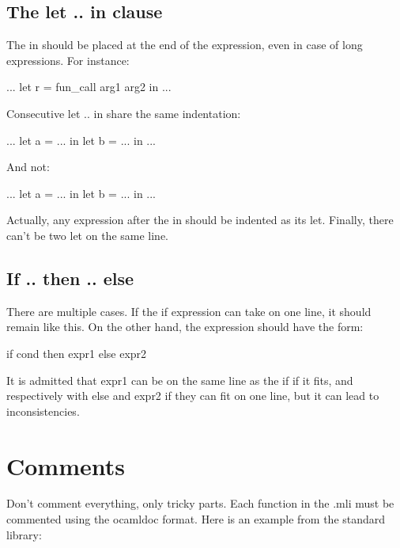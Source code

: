 \documentclass[12pt,a4paper]{article}
\begin{document}
\subsection*{The \textsf{let .. in} clause}

The \textsf{in} should be placed at the end of the expression, even in case of
long expressions. For instance:

\begin{OCaml}
...
let r = fun_call
  arg1
  arg2 in
...
\end{OCaml}

\noindent
Consecutive \textsf{let .. in} share the same indentation:

\begin{OCaml}
...
let a = ... in
let b = ... in
...
\end{OCaml}

And not:

\begin{OCaml}
...
let a = ... in
  let b = ... in
    ...
\end{OCaml}

\noindent
Actually, any expression after the \textsf{in} should be indented as its
\textsf{let}. Finally, there can't be two \textsf{let} on the same line.


\subsection*{\textsf{If .. then .. else}}

There are multiple cases. If the \textsf{if} expression can take on one line, it
should remain like this. On the other hand, the expression should have the form:

\begin{OCaml}
if cond then
  expr1
else
  expr2
\end{OCaml} 

\noindent
It is admitted that \textsf{expr1} can be on the same line as the \textsf{if} if
it fits, and respectively with \textsf{else} and \textsf{expr2} if they can fit
on one line, but it can lead to inconsistencies.

\section{Comments}

Don't comment everything, only tricky parts. Each function in the .mli must be
commented using the ocamldoc format. Here is an example from the standard
library:
\end{document}
